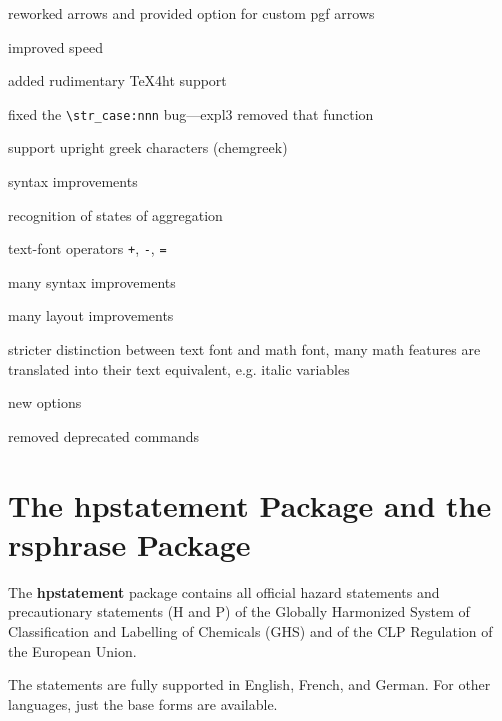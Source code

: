 \documentclass[a4paper,notitlepage,parskip=half]{scrreprt}
\begin{document}
\begin{compactitem}
\item reworked arrows and provided option for custom pgf arrows
\item improved speed
\end{compactitem}

\begin{compactitem}
\item added rudimentary TeX4ht support
\item fixed the \verb|\str_case:nnn| bug---expl3 removed that function
\end{compactitem}

\begin{compactitem}
\item support upright greek characters (chemgreek)
\item syntax improvements%
\item recognition of states of aggregation%
\item text-font operators \verb|+|, \verb|-|, \verb|=|
\end{compactitem}

\begin{compactitem}
\item many syntax improvements
\item many layout improvements
\item stricter distinction between text font and math font, many math features are translated into their text equivalent, e.g. italic variables
\item new options
\item removed deprecated commands
\end{compactitem}



\chapter{The hpstatement Package and the rsphrase Package}\label{sec:rsphrase}

The \textbf{hpstatement} package contains all official
hazard statements and precautionary statements (H and P) of the
Globally Harmonized System of Classification and Labelling of Chemicals (GHS)
and of the CLP Regulation of the European Union.

The statements are fully supported in
  English,
  French,
  and
  German.
For other languages, just the base forms are available.
\end{document}
